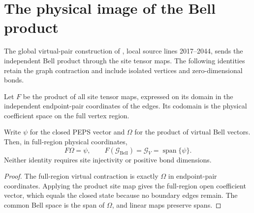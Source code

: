 \section{The physical image of the Bell product}%
\label{sec:peps_vertex_bond_state}

The global virtual-pair construction of
\cite[Section~IV.C.1]{Cirac2021Matrix}, local source lines 2017--2044,
sends the independent Bell product through the site tensor maps.
The following identities retain the graph contraction and
include isolated vertices and zero-dimensional bonds.

\begin{definition}%
    \label{def:peps_product_site_map_bonds}
    \leanok
    Let $F$ be the product of all site tensor maps, expressed on its
    domain in the independent endpoint-pair coordinates of the edges.
    Its codomain is the physical coefficient space on the full vertex
    region.
\end{definition}

\begin{lemma}%
    \label{thm:peps_bell_product_physical_image}
    \leanok
    Write $\psi$ for the closed PEPS vector and $\Omega$ for
    the product of virtual Bell vectors. Then, in full-region physical
    coordinates,
    \[
        F\Omega=\psi,\qquad
        F(\mathcal G_{\mathrm{Bell}})=\mathcal G_V
        =\operatorname{span}\{\psi\}.
    \]
    Neither identity requires site injectivity or positive bond
    dimensions.
\end{lemma}

\begin{proof}\leanok
    The full-region virtual contraction is exactly $\Omega$ in
    endpoint-pair coordinates. Applying the product site map gives
    the full-region open coefficient vector, which equals the closed
    state because no boundary edges remain. The common Bell space
    is the span of $\Omega$, and linear maps preserve spans.
\end{proof}

